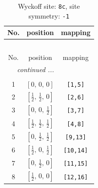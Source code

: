 \documentclass[fleqn,8pt]{jsarticle}
\begin{document}
\renewcommand{\arraystretch}{1.2}
\begin{longtable}{ccc}
\caption{Wyckoff site: {\tt 8c}, site symmetry: {\tt -1}}
 \\
 \hline \hline
No. & position & mapping \\ \hline \endfirsthead

\multicolumn{2}{l}{\tablename\ \thetable{}} \\
 \hline \hline
No. & position & mapping \\ \hline \endhead

 \hline \hline
\multicolumn{2}{r}{\footnotesize\it continued ...} \\ \endfoot

 \hline \hline
\multicolumn{2}{r}{} \\ \endlastfoot

1 & $\left[ 0,\, 0,\, 0 \right]$ & {\tt [1,5]} \\ \hline
2 & $\left[ \frac{1}{2},\, \frac{1}{2},\, 0 \right]$ & {\tt [2,6]} \\ \hline
3 & $\left[ 0,\, 0,\, \frac{1}{2} \right]$ & {\tt [3,7]} \\ \hline
4 & $\left[ \frac{1}{2},\, \frac{1}{2},\, \frac{1}{2} \right]$ & {\tt [4,8]} \\ \hline
5 & $\left[ 0,\, \frac{1}{2},\, \frac{1}{2} \right]$ & {\tt [9,13]} \\ \hline
6 & $\left[ \frac{1}{2},\, 0,\, \frac{1}{2} \right]$ & {\tt [10,14]} \\ \hline
7 & $\left[ 0,\, \frac{1}{2},\, 0 \right]$ & {\tt [11,15]} \\ \hline
8 & $\left[ \frac{1}{2},\, 0,\, 0 \right]$ & {\tt [12,16]} \\
\end{longtable}
\renewcommand{\arraystretch}{1.2}
\end{document}
